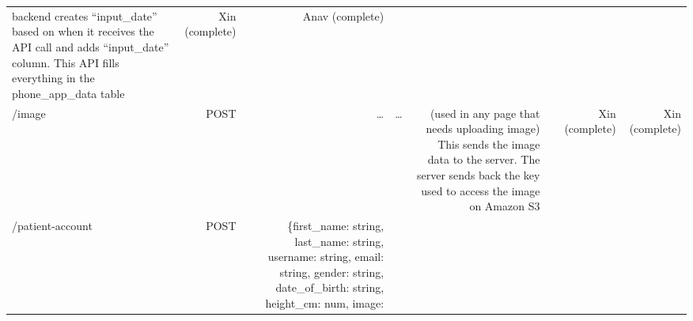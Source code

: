 \documentclass[]{book}
\begin{document}
\begin{longtable}[]{@{}lrrcrrrr@{}}
\begin{minipage}[t]{0.06\columnwidth}
backend creates ``input\_date'' based on when it receives the API call
and adds ``input\_date'' column. This API fills everything in the
phone\_app\_data table\strut
\end{minipage} & \begin{minipage}[t]{0.06\columnwidth}\raggedleft\strut
Xin (complete)\strut
\end{minipage} & \begin{minipage}[t]{0.06\columnwidth}\raggedleft\strut
Anav (complete)\strut
\end{minipage}\tabularnewline
\begin{minipage}[t]{0.12\columnwidth}\raggedright\strut
/image\strut
\end{minipage} & \begin{minipage}[t]{0.13\columnwidth}\raggedleft\strut
POST\strut
\end{minipage} & \begin{minipage}[t]{0.13\columnwidth}\raggedleft\strut
\ldots{}\strut
\end{minipage} & \begin{minipage}[t]{0.14\columnwidth}\centering\strut
\ldots{}\strut
\end{minipage} & \begin{minipage}[t]{0.06\columnwidth}\raggedleft\strut
(used in any page that needs uploading image) This sends the image data
to the server. The server sends back the key used to access the image on
Amazon S3\strut
\end{minipage} & \begin{minipage}[t]{0.06\columnwidth}\raggedleft\strut
\strut
\end{minipage} & \begin{minipage}[t]{0.06\columnwidth}\raggedleft\strut
Xin (complete)\strut
\end{minipage} & \begin{minipage}[t]{0.06\columnwidth}\raggedleft\strut
Xin (complete)\strut
\end{minipage}\tabularnewline
\begin{minipage}[t]{0.12\columnwidth}\raggedright\strut
/patient-account\strut
\end{minipage} & \begin{minipage}[t]{0.13\columnwidth}\raggedleft\strut
POST\strut
\end{minipage} & \begin{minipage}[t]{0.13\columnwidth}\raggedleft\strut
\{first\_name: string, last\_name: string, username: string, email:
string, gender: string, date\_of\_birth: string, height\_cm: num, image:

\end{minipage}
\end{longtable}
\end{document}
